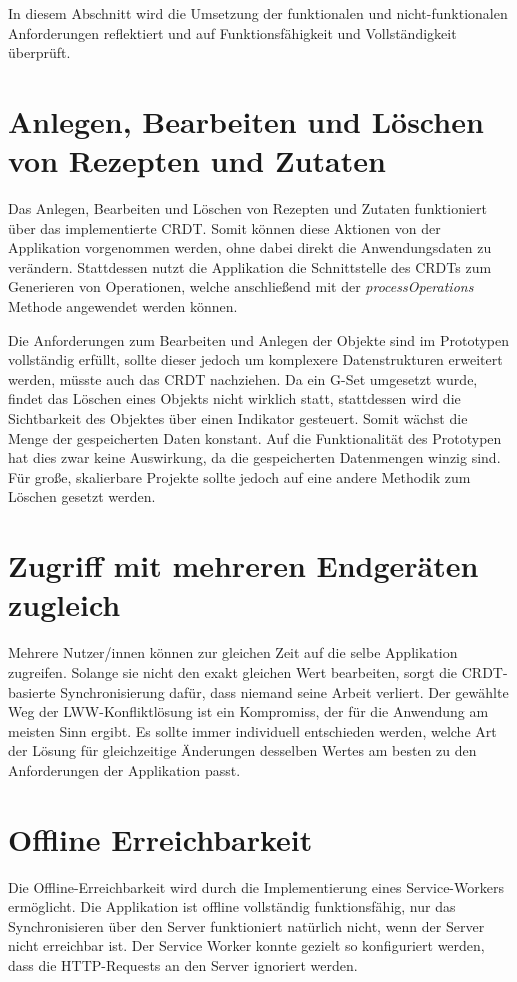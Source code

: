 \documentclass[a4paper, 12pt]{scrreprt}
\begin{document}
In diesem Abschnitt wird die Umsetzung der funktionalen und nicht-funktionalen Anforderungen reflektiert und auf Funktionsfähigkeit und Vollständigkeit überprüft.

\section{Anlegen, Bearbeiten und Löschen von Rezepten und Zutaten}
Das Anlegen, Bearbeiten und Löschen von Rezepten und Zutaten funktioniert über das implementierte CRDT. Somit können diese Aktionen von der Applikation vorgenommen werden, ohne dabei direkt die Anwendungsdaten zu verändern. Stattdessen nutzt die Applikation die Schnittstelle des \acp{CRDT} zum Generieren von Operationen, welche anschließend mit der \textit{processOperations} Methode angewendet werden können.

Die Anforderungen zum Bearbeiten und Anlegen der Objekte sind im Prototypen vollständig erfüllt, sollte dieser jedoch um komplexere Datenstrukturen erweitert werden, müsste auch das CRDT nachziehen. Da ein \ac{G-Set} umgesetzt wurde, findet das Löschen eines Objekts nicht wirklich statt, stattdessen wird die Sichtbarkeit des Objektes über einen Indikator gesteuert. Somit wächst die Menge der gespeicherten Daten konstant. Auf die Funktionalität des Prototypen hat dies zwar keine Auswirkung, da die gespeicherten Datenmengen winzig sind. Für große, skalierbare Projekte sollte jedoch auf eine andere Methodik zum Löschen gesetzt werden.

\section{Zugriff mit mehreren Endgeräten zugleich}
Mehrere Nutzer/innen können zur gleichen Zeit auf die selbe Applikation zugreifen. Solange sie nicht den exakt gleichen Wert bearbeiten, sorgt die CRDT-basierte Synchronisierung dafür, dass niemand seine Arbeit verliert. Der gewählte Weg der \ac{LWW}-Konfliktlösung ist ein Kompromiss, der für die Anwendung am meisten Sinn ergibt. Es sollte immer individuell entschieden werden, welche Art der Lösung für gleichzeitige Änderungen desselben Wertes am besten zu den Anforderungen der Applikation passt.

\section{Offline Erreichbarkeit}
Die Offline-Erreichbarkeit wird durch die Implementierung eines Service-Workers ermöglicht. Die Applikation ist offline vollständig funktionsfähig, nur das Synchronisieren über den Server funktioniert natürlich nicht, wenn der Server nicht erreichbar ist. Der Service Worker konnte gezielt so konfiguriert werden, dass die \ac{HTTP}-Requests an den Server ignoriert werden.
\end{document}
